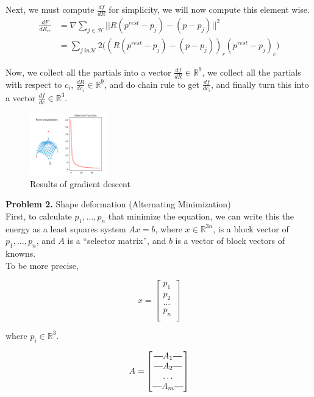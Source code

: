 \documentclass[a4paper]{article}
\newcommand*{\horzbar}{\rule[.5ex]{2.5ex}{0.5pt}}
\begin{document}
Next, we must compute $\frac{df}{dR}$ for simplicity, we will now compute this element wise.
\begin{align*}
    \frac{dF}{dR_{rc}}
    &= \nabla \sum_{j \in \mathcal{H}} ||R (p^{rest} - p_j) - (p - p_j)||^2 \\
    &= \sum_{j \ in \mathcal{H}} 2 \Big( (R (p^{rest} - p_j) - (p - p_j))_r (p^{rest} - p_j)_c \Big)
\end{align*}

Now, we collect all the partials into a vector $\frac{df}{dR} \in \mathbb{R}^9$, we collect all the partials with respect to $c_i$, $\frac{dR}{dc_i} \in \mathbb{R}^9$, and do chain rule to get $\frac{df}{dc_i}$, and finally turn this into a vector $\frac{df}{dc} \in \mathbb{R}^3$.

\begin{figure}[!h]
\centering
\includegraphics[width=0.3\textwidth]{cs395t_graphics_hw2_gradient1.png}
\caption{Results of gradient descent}
\end{figure}

\textbf{Problem 2.} Shape deformation (Alternating Minimization) \\

First, to calculate $p_1, \ldots, p_n$ that minimize the equation, we can write this the energy as a least squares system $Ax = b$, where $x \in \mathbb{R}^{3 n}$, is a block vector of $p_1, \ldots, p_n$,  and $A$ is a ``selector matrix'', and $b$ is a vector of block vectors of knowns. \\

To be more precise,

\[
    x = \begin{bmatrix}
        p_1 \\
        p_2 \\
        \ldots \\
        p_n \\
        \end{bmatrix}
\]

where $p_i \in \mathbb{R}^3$.

\[
    A = \begin{bmatrix}
        \horzbar A_1 \horzbar \\
        \horzbar A_2 \horzbar \\
        \ldots \\
        \horzbar A_m \horzbar \\
        \end{bmatrix}
\]
\end{document}
